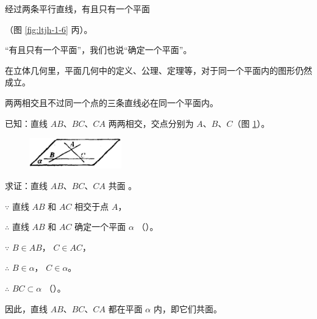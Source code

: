 \begin{tuilun}[推论3][tl:pm-3]
    经过两条平行直线，有且只有一个平面
\end{tuilun}（图 \ref{fig:ltjh-1-6} 丙）。

“有且只有一个平面”，我们也说“确定一个平面”。

\zhuyi 在立体几何里，平面几何中的定义、公理、定理等，对于同一个平面内的图形仍然成立。


\liti[0] 两两相交且不过同一个点的三条直线必在同一个平面内。

已知：直线 $AB$、$BC$、$CA$ 两两相交，交点分别为 $A$、$B$、$C$（图 \ref{fig:ltjh-1-7}）。

\begin{figure}
    \centering
    \includegraphics[width=4cm]{../pic/ltjh-ch1-07.png}
    \caption{}\label{fig:ltjh-1-7}
\end{figure}

求证：直线 $AB$、$BC$、$CA$ 共面 \footnotemark 。

\zhengming $\because$ \quad 直线 $AB$ 和 $AC$ 相交于点 $A$，

$\therefore$ \quad 直线 $AB$ 和 $AC$ 确定一个平面 $\alpha$ （）。

$\because$ \quad $B \in AB$， $C \in AC$，

$\therefore$ \quad $B \in \alpha$， $C \in \alpha$。

$\therefore$ \quad $BC \subset \alpha$ （）。

因此，直线 $AB$、$BC$、$CA$ 都在平面 $\alpha$ 内，即它们共面。



